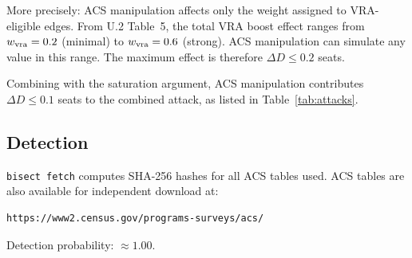 More precisely: ACS manipulation affects only the weight assigned to
VRA-eligible edges.
From U.2 Table~5, the total VRA boost effect ranges from $w_{\rm vra} = 0.2$
(minimal) to $w_{\rm vra} = 0.6$ (strong).
ACS manipulation can simulate any value in this range.
The maximum effect is therefore $\Delta D \leq 0.2$ seats.

Combining with the saturation argument, ACS manipulation contributes
$\Delta D \leq 0.1$ seats to the combined attack, as listed in
Table~\ref{tab:attacks}.

\subsection{Detection}

\texttt{bisect fetch} computes SHA-256 hashes for all ACS tables used.
ACS tables are also available for independent download at:
\begin{verbatim}
https://www2.census.gov/programs-surveys/acs/
\end{verbatim}
Detection probability: $\approx 1.00$.
